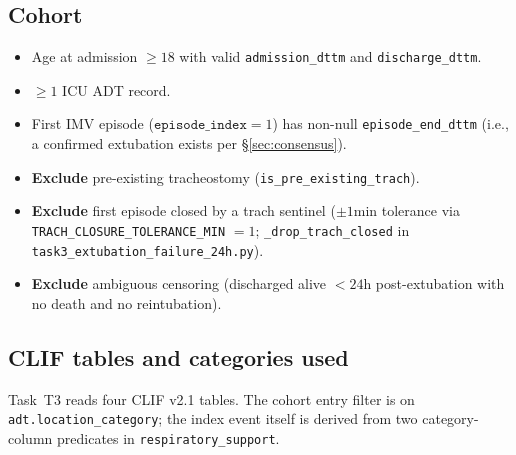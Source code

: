 \documentclass[11pt]{article}
\begin{document}
\subsection{Cohort}
\label{sec:cohort}

\begin{itemize}[leftmargin=2em]
  \item Age at admission $\ge 18$ with valid \texttt{admission\_dttm}
        and \texttt{discharge\_dttm}.
  \item $\geq 1$ ICU ADT record.
  \item First IMV episode ($\texttt{episode\_index} = 1$) has
        non-null \texttt{episode\_end\_dttm} (i.e., a confirmed
        extubation exists per \S\ref{sec:consensus}).
  \item \textbf{Exclude} pre-existing tracheostomy
        (\texttt{is\_pre\_existing\_trach}).
  \item \textbf{Exclude} first episode closed by a trach sentinel
        ($\pm 1$min tolerance via
        \texttt{TRACH\_CLOSURE\_TOLERANCE\_MIN} $= 1$;
        \texttt{\_drop\_trach\_closed} in
        \texttt{task3\_extubation\_failure\_24h.py}).
  \item \textbf{Exclude} ambiguous censoring (discharged alive
        $<24$h post-extubation with no death and no reintubation).
\end{itemize}

\subsection{CLIF tables and categories used}
\label{sec:t3-clif}

Task~T3 reads four CLIF v2.1 tables. The cohort entry filter is on
\texttt{adt.location\_category}; the index event itself is derived from
two category-column predicates in \texttt{respiratory\_support}.
\end{document}
